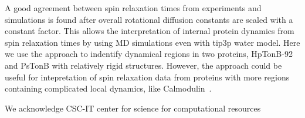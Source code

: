 \documentclass[pre,aps,floatfix,authordate1-4,twocolumn]{revtex4-1}
\begin{document}
A good agreement between spin relaxation times from experiments and simulations is
found after overall rotational diffusion constants are scaled with a constant
factor. This allows the interpretation of internal protein dynamics
from spin relaxation times by using MD simulations even with tip3p water model.
Here we use the approach to indentify dynamical regions in two proteins,
HpTonB-92 and PsTonB with relatively rigid structures. However, the
approach could be useful for intepretation of spin relaxation data from
proteins with more regions containing complicated local dynamics, like
Calmodulin~\cite{trjandra95}.


\begin{acknowledgments}
  We acknowledge CSC-IT center for science for computational resources %
\end{acknowledgments}


\end{document}
